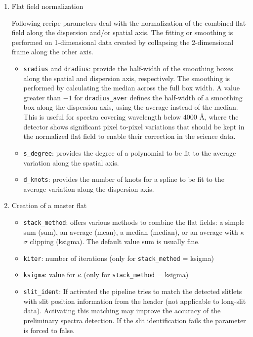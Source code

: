 \begin{enumerate}

\item Flat field normalization

Following recipe parameters deal with the normalization of the combined flat
field along the dispersion and/or spatial axis. The fitting or smoothing is performed on 1-dimensional data
created by collapsing the 2-dimensional frame along the other axis.

\begin{itemize}
\item {\tt sradius} and {\tt dradius}: provide the half-width of the smoothing boxes along the spatial and dispersion axis, respectively. The smoothing is performed by calculating the median across the full
box width. A value greater than $-1$ for {\tt dradius\_aver} defines the half-width of a smoothing box along the dispersion axis, using the average instead of the median. This is useful for spectra
covering wavelength below 4000 Å, where the detector shows significant pixel to-pixel variations that should be kept in the normalized flat field to enable their correction in the science data.

\item {\tt s\_degree}: provides the degree of a polynomial to be fit to the average variation along the spatial axis.

\item {\tt d\_knots}: provides the number of knots for a spline to be fit to the average variation along the dispersion axis.

\end{itemize}

\item Creation of a master flat

\begin{itemize}
\item {\tt stack\_method}: offers various methods to combine the flat fields: a simple sum (sum), an average (mean), a median (median), or an average with $\kappa$ - $\sigma$ clipping (ksigma). The default value sum is usually fine.

\item {\tt kiter}: number of iterations (only for {\tt stack\_method} = ksigma)

\item {\tt ksigma}: value for $\kappa$ (only for {\tt stack\_method} = ksigma)

\item {\tt slit\_ident}: If activated the pipeline tries to match the detected slitlets with slit position information from the header (not applicable to long-slit data). Activating this matching may improve
the accuracy of the preliminary spectra detection. If the slit identification fails the parameter is forced to false.


\end{itemize}
\end{enumerate}
